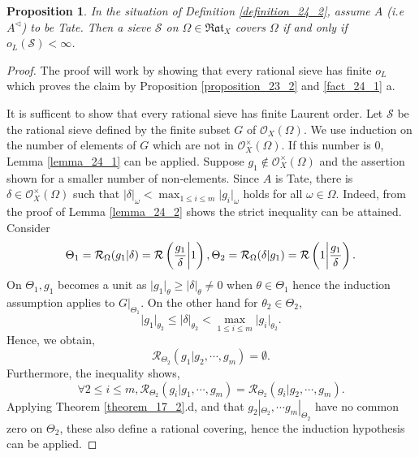 \documentclass[8pt]{article}
\numberwithin{equation}{section}
\newtheorem{proposition}{Proposition}[subsection]
\newcommand{\cR}[0]{\mathcal{R}}
\newcommand{\ab}[1]{\vert #1 \vert}
\newcommand{\sS}[0]{\mathscr{S}}
\newcommand{\cO}[0]{\mathcal{O}}
\newcommand{\Rat}[0]{\mathfrak{Rat}}
\begin{document}
\begin{proposition}
    \label{proposition_24_5}
    In the situation of Definition \ref{definition_24_2}, assume $A$ (i.e $A^\triangleleft$) to be Tate. Then a sieve $\sS$ on $\Omega\in\Rat_X$ covers $\Omega$ if and only if $o_L(\sS)<\infty$. 
\end{proposition}
\begin{proof}
    The proof will work by showing that every rational sieve has finite $o_L$ which proves the claim by Proposition \ref{proposition_23_2} and \ref{fact_24_1} a.
    \par It is sufficent to show that every rational sieve has finite Laurent order. Let $\sS$ be the rational sieve defined by the finite subset $G$ of $\cO_X(\Omega)$. We use induction on the number of elements of $G$ which are not in $\mathcal{O}_X^\times(\Omega)$.
    If this number is $0$, Lemma \ref{lemma_24_1} can be applied. Suppose $g_1\not\in\mathcal{O}_X^\times(\Omega)$ and the assertion shown for a smaller number of non-elements.
    Since $A$ is Tate, there is $\delta\in\mathcal{O}_X^\times(\Omega)$ such that $\ab{\delta}_\omega <\max_{1\leq i\leq m}\ab{g_i}_\omega$ holds for all $\omega\in\Omega$. Indeed, from the proof of Lemma \ref{lemma_24_2} shows the strict inequality can be attained. Consider 
    \begin{equation*}
        \Theta_1 = \cR_\Omega(g_1|\delta)=\cR\left({\frac {g_1} \delta}\bigg{\vert}1\right),\Theta_2 = \cR_\Omega(\delta|g_1) = \cR\left(1\bigg{\vert}{\frac {g_1} \delta}\right).
    \end{equation*}
    On $\Theta_1,g_1$ becomes a unit as $\ab{g_1}_\theta\geq\ab{\delta}_\theta\not=0$ when $\theta\in\Theta_1$ hence the induction assumption applies to $G|_{\Theta_1}$. 
    On the other hand for $\theta_2\in\Theta_2$, 
    \begin{equation*}
        \ab{g_1}_{\theta_2}\leq \ab{\delta}_{\theta_2}<\max_{1\leq i\leq m}\ab{g_i}_{\theta_2}.
    \end{equation*}
    Hence, we obtain,
    \begin{equation*}
        \cR_{\Theta_2}(g_1|g_2,\cdots,g_m) = \emptyset.
    \end{equation*}
    Furthermore, the inequality shows,
    \begin{equation*}
        \forall 2\leq i\leq m, \cR_{\Theta_2}(g_i|g_1,\cdots,g_m) = \cR_{\Theta_2}(g_i|g_2,\cdots,g_m).
    \end{equation*}
    Applying Theorem \ref{theorem_17_2}.d, and that $g_2|_{\Theta_2},\cdots g_m|_{\Theta_2}$ have no common zero on $\Theta_2$, these also define a rational covering, hence the induction hypothesis can be applied.

\end{proof}
\end{document}
